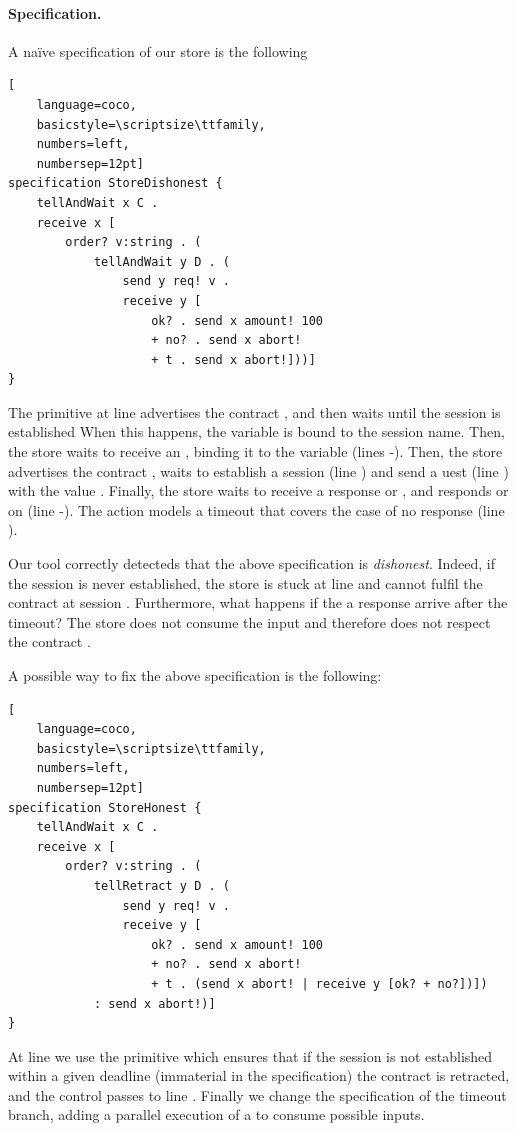 \paragraph{Specification.}
A naïve \coco specification of our store is the following
\begin{lstlisting}[
    language=coco,
    basicstyle=\scriptsize\ttfamily,
    numbers=left,
    numbersep=12pt]
specification StoreDishonest {
    tellAndWait x C .
    receive x [
        order? v:string . (
            tellAndWait y D . (
                send y req! v .
                receive y [
                    ok? . send x amount! 100
                    + no? . send x abort!
                    + t . send x abort!]))]
}
\end{lstlisting}

The primitive  at line 
advertises the contract ,
and then waits until the session is established
When this happens, the variable  is bound to the session name.
Then, the store waits to receive an , 
binding it to the variable  (lines -).
Then, the store advertises the contract , waits to establish a session
 (line ) and send a uest (line ) with
the value .
Finally, the store waits to receive a response  or ,
and responds  or  on  (line -). 
The action  models a timeout 
that covers the case of no response (line ).

Our tool correctly detecteds that the above specification is \emph{dishonest}.
Indeed, if the session 
is never established, 
the store is stuck at line  
and cannot fulfil the contract  at session .
Furthermore, what happens if the a response arrive after the timeout?
The store does not consume the input and 
therefore does not respect the contract .

A possible way to fix the above specification is the following:
\begin{lstlisting}[
    language=coco,
    basicstyle=\scriptsize\ttfamily,
    numbers=left,
    numbersep=12pt]
specification StoreHonest {
    tellAndWait x C .
    receive x [
        order? v:string . (
            tellRetract y D . (
                send y req! v .
                receive y [
                    ok? . send x amount! 100
                    + no? . send x abort!
                    + t . (send x abort! | receive y [ok? + no?])]) 
            : send x abort!)]
}
\end{lstlisting}
At line  we use the primitive 
which ensures that if the session  is not established
within a given deadline (immaterial in the specification)
the contract  is retracted,
and the control passes to line .
Finally we change the specification of the timeout branch,
adding a parallel execution of a 
to consume possible inputs.


